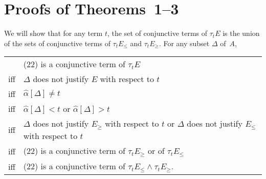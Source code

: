 \documentclass{tlp}
\begin{document}
\section*{Proofs of Theorems~1--3}
\label{app:proofs}

\begin{proof*}
We will show that for any term $t$, the set of conjunctive terms of
$\tau_t E$ is the union
of the sets of conjunctive terms of $\tau_t E_{\leq}$ and $\tau_t E_{\geq}$.
For any subset $\Delta$ of~$A$,
\begin{center}
\begin{tabular}{l  l}
    & (22) is a conjunctive term of $\tau_t E$ \\
iff & $\Delta$ does not justify $E$ with respect to $t$ \\
iff & $\widehat{\alpha}[\Delta] \not = t$ \\
iff & $\widehat{\alpha}[\Delta] < t$ or $\widehat{\alpha}[\Delta] > t$ \\
iff & $\Delta$ does not justify $E_{\ge}$ with respect to $t$ or $\Delta$ does not justify
$E_{\le}$ with respect to $t$\\
iff & (22) is a conjunctive term of $\tau_t E_{\ge}$ or of
$\tau_t E_{\le}$\\
iff & (22) is a conjunctive term of $\tau_t E_{\le} \land \tau_t E_{\ge}.$
\end{tabular}
\end{center}
\end{proof*}

\newpage
\end{document}
